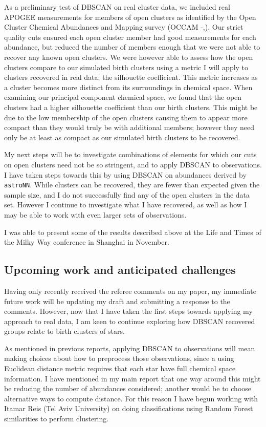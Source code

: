 \documentclass[11pt]{article}
\begin{document}
	As a preliminary test of DBSCAN on real cluster data, we included real APOGEE measurements for members of open clusters as identified by the Open Cluster Chemical Abundances and Mapping survey (OCCAM -\citealt{Frinchaboy2003},\citealt{Donor2018}). Our strict quality cuts ensured each open cluster member had good measurements for each abundance, but reduced the number of members enough that we were not able to recover any known open clusters. We were however able to assess how the open clusters compare to our simulated birth clusters using a metric I will apply to clusters recovered in real data; the silhouette coefficient. This metric increases as a cluster becomes more distinct from its surroundings in chemical space. When examining our principal component chemical space, we found that the open clusters had a higher silhouette coefficient than our birth clusters. This might be due to the low membership of the open clusters causing them to appear more compact than they would truly be with additional members; however they need only be at least as compact as our simulated birth clusters to be recovered.
	
	My next steps will be to investigate combinations of elements for which our cuts on open clusters need not be so stringent, and to apply DBSCAN to observations. I have taken steps towards this by using DBSCAN on abundances derived by \texttt{astroNN}. While clusters can be recovered, they are fewer than expected given the sample size, and I do not successfully find any of the open clusters in the data set. However I continue to investigate what I have recovered, as well as how I may be able to work with even larger sets of observations.
	
	I was able to present some of the results described above at the Life and Times of the Milky Way conference in Shanghai in November.
    
    \subsection*{Upcoming work and anticipated challenges}
    
    Having only recently received the referee comments on my paper, my immediate future work will be updating my draft and submitting a response to the comments. However, now that I have taken the first steps towards applying my approach to real data, I am keen to continue exploring how DBSCAN recovered groups relate to birth clusters of stars. 
    
    As mentioned in previous reports, applying DBSCAN to observations will mean making choices about how to preprocess those observations, since a using Euclidean distance metric requires that each star have full chemical space information. I have mentioned in my main report that one way around this might be reducing the number of abundances considered; another would be to choose alternative ways to compute distance. For this reason I have begun working with Itamar Reis (Tel Aviv University) on doing classifications using Random Forest similarities \citep{Reis2019} to perform clustering.
    
\end{document}
